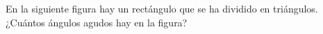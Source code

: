 En la siguiente figura hay un rectángulo que se ha dividido en triángulos. ¿Cuántos ángulos agudos hay en la figura?